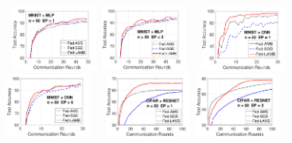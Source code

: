 \documentclass[twoside]{article}
\begin{document}
\begin{figure}[t!]
    \begin{center}
        \mbox{
        \hspace{-0.05in}\includegraphics[width=0.25\textwidth]{new_figure/mnist_testerror_mlp_ep1_client50_iid0.pdf}
        \hspace{-0.1in}\includegraphics[width=0.25\textwidth]{new_figure/mnist_testerror_mlp_ep5_client50_iid0.pdf}
        }
        \mbox{
        \hspace{-0.05in}\includegraphics[width=0.25\textwidth]{new_figure/mnist_testerror_cnn_ep1_client50_iid0.pdf}
        \hspace{-0.1in}\includegraphics[width=0.25\textwidth]{new_figure/mnist_testerror_cnn_ep5_client50_iid0.pdf}
        }
        \mbox{
        \hspace{-0.05in}\includegraphics[width=0.25\textwidth]{new_figure/cifar_testerror_resnet_ep1_client50_iid0.pdf}
        \hspace{-0.1in}\includegraphics[width=0.25\textwidth]{new_figure/cifar_testerror_resnet_ep3_client50_iid0.pdf}        
}
\end{center}
\end{figure}
\end{document}
